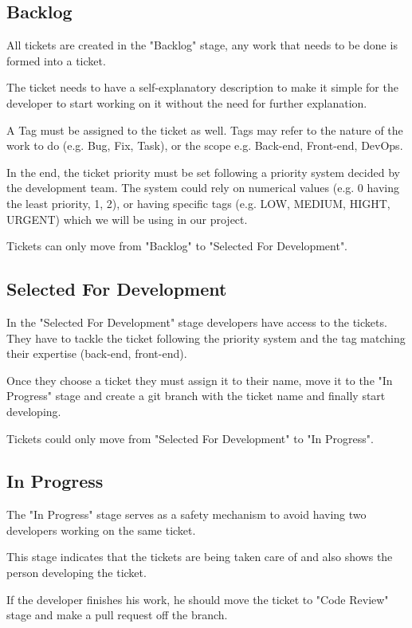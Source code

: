 \begin{spacing}{1.2}
\subsection{Backlog}
All tickets are created in the "Backlog" stage, any work that needs to be done is formed into a ticket.\newline

The ticket needs to have a self-explanatory description to make it simple for the developer to start working on it without the need for further explanation.
\newline

A Tag must be assigned to the ticket as well. Tags may refer to the nature of the work to do (e.g. Bug, Fix, Task), or the scope e.g. Back-end, Front-end, DevOps.
\newline

In the end, the ticket priority must be set following a priority system decided by the development team. The system could rely on numerical values (e.g. 0 having the least priority, 1, 2), or having specific tags (e.g. LOW, MEDIUM, HIGHT, URGENT) which we will be using in our project.
\newline

Tickets can only move from "Backlog" to "Selected For Development".
\subsection{Selected For Development}
In the "Selected For Development" stage developers have access to the tickets. They have to tackle the ticket following the priority system and the tag matching their expertise (back-end, front-end).

Once they choose a ticket they must assign it to their name, move it to the "In Progress" stage and create a git branch with the ticket name and finally start developing.

Tickets could only move from "Selected For Development" to "In Progress".
\subsection{In Progress}
The "In Progress" stage serves as a safety mechanism to avoid having two developers working on the same ticket.

This stage indicates that the tickets are being taken care of and also shows the person developing the ticket.

If the developer finishes his work, he should move the ticket to "Code Review" stage and make a pull request off the branch.



\end{spacing}
